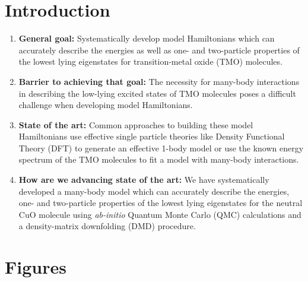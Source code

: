 \documentclass{article}
\begin{document}
\section{Introduction}
\begin{enumerate}
\item \textbf{General goal: }
Systematically develop model Hamiltonians which can accurately describe the energies as well as one- and two-particle properties of the lowest lying eigenstates for transition-metal oxide (TMO) molecules.

\item \textbf{Barrier to achieving that goal: } The necessity for many-body interactions in describing the low-lying excited states of TMO molecules poses a difficult challenge when developing model Hamiltonians.

\item \textbf{State of the art: } Common approaches to building these model Hamiltonians use effective single particle theories like Density Functional Theory (DFT) to generate an effective 1-body model or use the known energy spectrum of the TMO molecules to fit a model with many-body interactions.

\item\textbf{How are we advancing state of the art: } We have systematically developed a many-body model which can accurately describe the energies, one- and two-particle properties of the lowest lying eigenstates for the neutral CuO molecule using \textit{ab-initio} Quantum Monte Carlo (QMC) calculations and a density-matrix downfolding (DMD) procedure. 
\end{enumerate}

\section{Figures}
\end{document}
